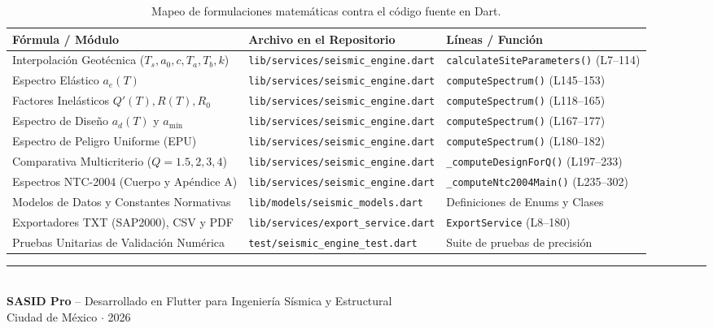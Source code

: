 \documentclass[11pt,a4paper]{article}
\begin{document}
\begin{table}[h!]
\centering
\small
\renewcommand{\arraystretch}{1.3}
\begin{tabular}{@{}lll@{}}
\toprule
\textbf{Fórmula / Módulo} & \textbf{Archivo en el Repositorio} & \textbf{Líneas / Función} \\
\midrule
Interpolación Geotécnica ($T_s, a_0, c, T_a, T_b, k$) & \texttt{lib/services/seismic\_engine.dart} & \texttt{calculateSiteParameters()} (L7--114) \\
Espectro Elástico $a_e(T)$ & \texttt{lib/services/seismic\_engine.dart} & \texttt{computeSpectrum()} (L145--153) \\
Factores Inelásticos $Q'(T), R(T), R_0$ & \texttt{lib/services/seismic\_engine.dart} & \texttt{computeSpectrum()} (L118--165) \\
Espectro de Diseño $a_d(T)$ y $a_{\text{mín}}$ & \texttt{lib/services/seismic\_engine.dart} & \texttt{computeSpectrum()} (L167--177) \\
Espectro de Peligro Uniforme (EPU) & \texttt{lib/services/seismic\_engine.dart} & \texttt{computeSpectrum()} (L180--182) \\
Comparativa Multicriterio ($Q=1.5, 2, 3, 4$) & \texttt{lib/services/seismic\_engine.dart} & \texttt{\_computeDesignForQ()} (L197--233) \\
Espectros NTC-2004 (Cuerpo y Apéndice A) & \texttt{lib/services/seismic\_engine.dart} & \texttt{\_computeNtc2004Main()} (L235--302) \\
Modelos de Datos y Constantes Normativas & \texttt{lib/models/seismic\_models.dart} & Definiciones de Enums y Clases \\
Exportadores TXT (SAP2000), CSV y PDF & \texttt{lib/services/export\_service.dart} & \texttt{ExportService} (L8--180) \\
Pruebas Unitarias de Validación Numérica & \texttt{test/seismic\_engine\_test.dart} & Suite de pruebas de precisión \\
\bottomrule
\end{tabular}
\caption{Mapeo de formulaciones matemáticas contra el código fuente en Dart.}
\end{table}

\vspace{0.4cm}
\begin{center}
    \rule{0.6\linewidth}{0.5pt}\\[6pt]
    \small\textsf{\textbf{SASID Pro} -- Desarrollado en Flutter para Ingeniería Sísmica y Estructural}\\
    \small\textsf{Ciudad de México $\cdot$ 2026}
\end{center}
\end{document}
